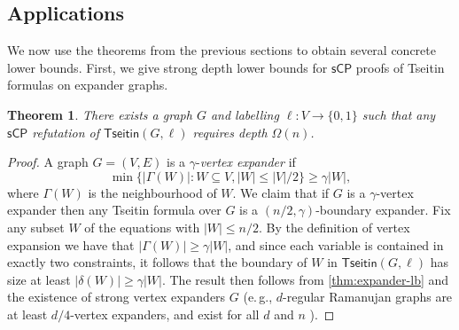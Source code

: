 \documentclass[11pt]{article}
\numberwithin{equation}{section}
\newtheorem{theorem}{Theorem}[section]
\theoremstyle{definition}
\theoremstyle{plain}
\newcommand{\eg}{e.\,g.}
\newcounter{cor}\renewcommand{\thecor}{1.1.\arabic{cor}}\newenvironment{cor}{\ifnum\value{cor}=0\refstepcounter{cor}\else\PackageError{toc-native-compat}{Unsupported additional cor envelope}{Only the one exact source-observed cor paragraph is allowed.}\fi}{}\providecommand{\corautorefname}{Theorem}
\newcommand{\set}[1]{\{ #1 \}}
\newcommand{\Tseitin}{\ensuremath{\mathsf{Tseitin}}}
\newcommand{\sCP}{\ensuremath{\mathsf{sCP}}}
\begin{document}
\subsection{Applications}
We now use the theorems from the previous sections to obtain several concrete lower bounds.
First, we give strong depth lower bounds for $\sCP$ proofs of Tseitin formulas on expander graphs. 
\begin{theorem}\label{cor:TseitinLowerBound}
	There exists a graph $G$ and labelling $\ell:V \rightarrow \{0,1\}$ such that any $\sCP$ refutation of $\Tseitin(G,\ell)$ requires depth $\Omega(n)$. 
\end{theorem}
\begin{proof}
	A graph $G=(V,E)$ is a $\gamma$-\emph{vertex expander} if 
	\[\min \set{|\Gamma(W)| : W \subseteq V, |W| \leq |V|/2} \geq \gamma|W|,\]
	where $\Gamma(W)$ is the neighbourhood of $W$.
	We claim that if $G$ is a $\gamma$-vertex expander then any Tseitin formula over $G$ is a $(n/2, \gamma)$-boundary expander.
	Fix any subset $W$ of the equations with $|W| \leq n/2$. 
	By the definition of vertex expansion we have that $|\Gamma(W)| \geq \gamma|W|$, and since each variable is contained in exactly two constraints, it follows that the boundary of $W$ in $\Tseitin(G,\ell)$ has size at least $|\delta(W)| \geq \gamma|W|$.
	The result then follows from \autoref{thm:expander-lb} and the existence of strong vertex expanders $G$ (\eg, $d$-regular Ramanujan graphs are at least $d/4$-vertex expanders, and exist for all $d$ and $n$ \cite{MarcusSS18}).
\end{proof}
\end{document}
